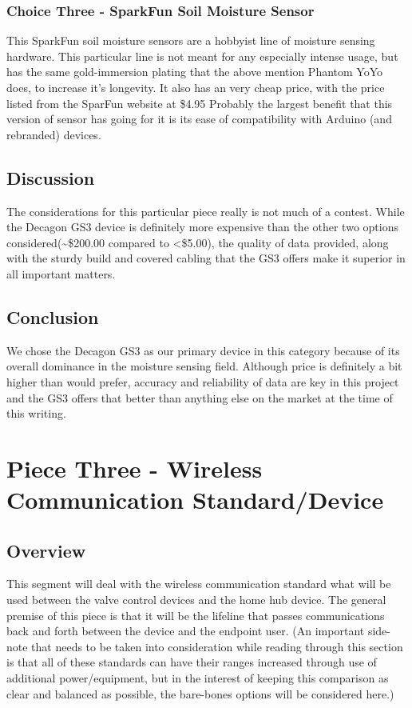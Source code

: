 \documentclass[onecolumn, draftclsnofoot,10pt, compsoc]{IEEEtran}
\begin{document}
    \subsubsection{Choice Three - SparkFun Soil Moisture Sensor}
    This SparkFun soil moisture sensors are a hobbyist line of moisture sensing hardware.
    This particular line is not meant for any especially intense usage, but has the same gold-immersion plating that the above mention Phantom YoYo does, to increase it's longevity.
    It also has an very cheap price, with the price listed from the SparFun website at \$4.95
    Probably the largest benefit that this version of sensor has going for it is its ease of compatibility with Arduino (and rebranded) devices.
    
    \subsection{Discussion}
    The considerations for this particular piece really is not much of a contest.
    While the Decagon GS3 device is definitely more expensive than the other two options considered(\textasciitilde \$200.00 compared to <\$5.00), the quality of data provided, along with the sturdy build and covered cabling that the GS3 offers make it superior in all important matters.
    
    \subsection{Conclusion}
    We chose the Decagon GS3 as our primary device in this category because of its overall dominance in the moisture sensing field. Although price is definitely a bit higher than would prefer, accuracy and reliability of data are key in this project and the GS3 offers that better than anything else on the market at the time of this writing.
    
    \section{Piece Three - Wireless Communication Standard/Device}
    \subsection{Overview}
	This segment will deal with the wireless communication standard what will be used between the valve control devices and the home hub device.
    The general premise of this piece is that it will be the lifeline that passes communications back and forth between the device and the endpoint user.
    (An important side-note that needs to be taken into consideration while reading through this section is that all of these standards can have their ranges increased through use of additional power/equipment, but in the interest of keeping this comparison as clear and balanced as possible, the bare-bones options will be considered here.)
\end{document}
